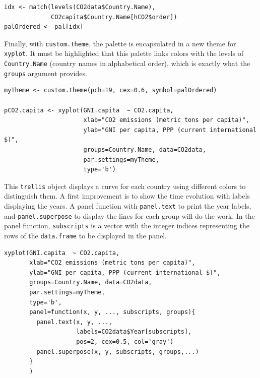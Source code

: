 \lstset{language=R}
\begin{lstlisting}
idx <- match(levels(CO2data$Country.Name), 
             CO2capita$Country.Name[hCO2$order])
palOrdered <- pal[idx]
\end{lstlisting}

Finally, with \texttt{custom.theme}, the palette is encapsulated in a new
theme for \texttt{xyplot}. It must be highlighted that this palette links
colors with the levels of \texttt{Country.Name} (country names in
alphabetical order), which is exactly what the \texttt{groups} argument
provides.  


\lstset{language=R}
\begin{lstlisting}
myTheme <- custom.theme(pch=19, cex=0.6, symbol=palOrdered)

pCO2.capita <- xyplot(GNI.capita  ~ CO2.capita,
                      xlab="CO2 emissions (metric tons per capita)",
                      ylab="GNI per capita, PPP (current international $)",
                      groups=Country.Name, data=CO2data,
                      par.settings=myTheme,
                      type='b')
\end{lstlisting}

This \texttt{trellis} object displays a curve for each country using
different colors to distinguish them. A first improvement is to show
the time evolution with labels displaying the years.  A panel function
with \texttt{panel.text} to print the year labels, and \texttt{panel.superpose} to
display the lines for each group will do the work. In the panel
function, \texttt{subscripts} is a vector with the integer indices
representing the rows of the \texttt{data.frame} to be displayed in the
panel.


 

\lstset{language=R}
\begin{lstlisting}
xyplot(GNI.capita  ~ CO2.capita,
       xlab="CO2 emissions (metric tons per capita)",
       ylab="GNI per capita, PPP (current international $)",
       groups=Country.Name, data=CO2data,
       par.settings=myTheme,
       type='b', 
       panel=function(x, y, ..., subscripts, groups){
         panel.text(x, y, ...,
                    labels=CO2data$Year[subscripts],
                    pos=2, cex=0.5, col='gray')
         panel.superpose(x, y, subscripts, groups,...)
       }
       )
\end{lstlisting}

